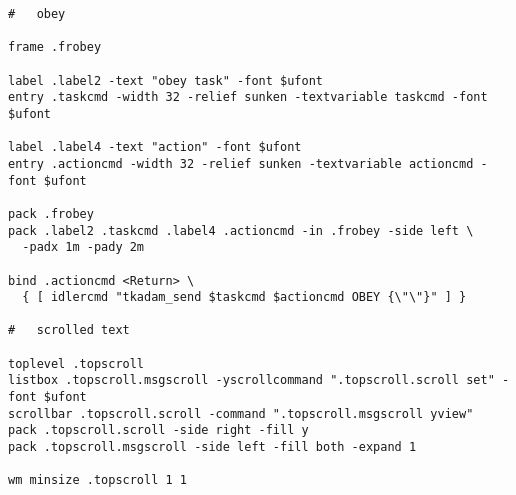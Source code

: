 \begin{verbatim}
#   obey

frame .frobey

label .label2 -text "obey task" -font $ufont
entry .taskcmd -width 32 -relief sunken -textvariable taskcmd -font $ufont

label .label4 -text "action" -font $ufont
entry .actioncmd -width 32 -relief sunken -textvariable actioncmd -font $ufont

pack .frobey
pack .label2 .taskcmd .label4 .actioncmd -in .frobey -side left \
  -padx 1m -pady 2m

bind .actioncmd <Return> \
  { [ idlercmd "tkadam_send $taskcmd $actioncmd OBEY {\"\"}" ] }

#   scrolled text

toplevel .topscroll
listbox .topscroll.msgscroll -yscrollcommand ".topscroll.scroll set" -font $ufont
scrollbar .topscroll.scroll -command ".topscroll.msgscroll yview"
pack .topscroll.scroll -side right -fill y
pack .topscroll.msgscroll -side left -fill both -expand 1

wm minsize .topscroll 1 1


\end{verbatim}




